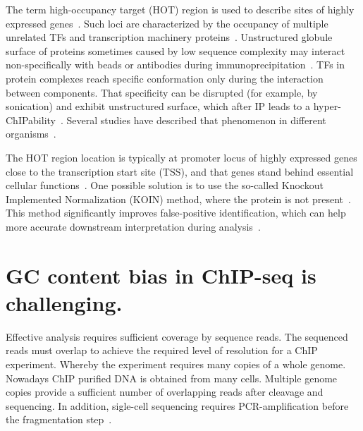 The term high-occupancy target (HOT) region is used to describe sites of highly expressed genes~\cite{teytelman2013highly}.  
Such loci are characterized by the occupancy of multiple unrelated TFs and transcription machinery proteins~\cite{boyle2014comparative}. 
Unstructured globule surface of proteins sometimes caused by low sequence complexity may interact non-specifically with beads or antibodies during immunoprecipitation~\cite{teytelman2013highly}.
TFs in protein complexes reach specific conformation only during the interaction between components. 
That specificity can be disrupted (for example, by sonication) and exhibit unstructured surface, which after IP leads to a hyper-ChIPability~\cite{jain2015active}.
Several studies have described that phenomenon in different organisms~\cite{boyle2014comparative, fan2009does, krebs2014optimization, teytelman2013highly,   waldminghaus2010chip, xie2013dynamic}.

The HOT region location is typically at promoter locus of highly expressed genes close to the transcription start site (TSS), and that genes stand behind essential cellular functions~\cite{wreczycka2019hot}. 
One possible solution is to use the so-called Knockout Implemented Normalization (KOIN) method, where the protein is not present~\cite{krebs2014optimization}.
This method significantly improves false-positive identification, which can help more accurate downstream interpretation during analysis~\cite{wreczycka2019hot}.

\section{GC content bias in ChIP-seq is challenging.}

Effective analysis requires sufficient coverage by sequence reads. 
The sequenced reads must overlap to achieve the required level of resolution for a ChIP experiment.
Whereby the experiment requires many copies of a whole genome.
Nowadays ChIP purified DNA is obtained from many cells.
Multiple genome copies provide a sufficient number of overlapping reads after cleavage and sequencing.
In addition, sigle-cell sequencing requires PCR-amplification before the fragmentation step~\cite{clark2016single}.

